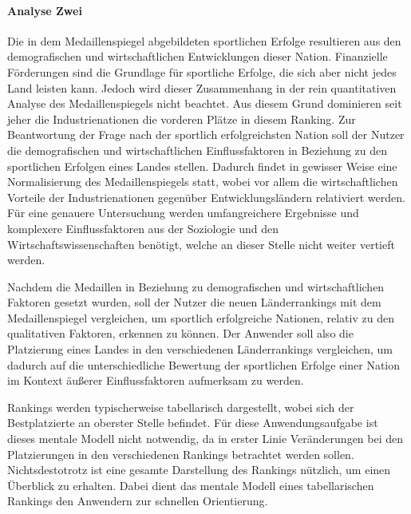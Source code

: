 \paragraph{Analyse Zwei}
Die in dem Medaillenspiegel abgebildeten sportlichen Erfolge resultieren aus den demografischen und wirtschaftlichen Entwicklungen dieser Nation. Finanzielle Förderungen sind die Grundlage für sportliche Erfolge, die sich aber nicht jedes Land leisten kann. Jedoch wird dieser Zusammenhang in der rein quantitativen Analyse des Medaillenspiegels nicht beachtet. Aus diesem Grund dominieren seit jeher die Industrienationen die vorderen Plätze in diesem Ranking. Zur Beantwortung der Frage nach der sportlich erfolgreichsten Nation soll der Nutzer die demografischen und wirtschaftlichen Einflussfaktoren in Beziehung zu den sportlichen Erfolgen eines Landes stellen. Dadurch findet in gewisser Weise eine Normalisierung des Medaillenspiegels statt, wobei vor allem die wirtschaftlichen Vorteile der Industrienationen gegenüber Entwicklungsländern relativiert werden. Für eine genauere Untersuchung werden umfangreichere Ergebnisse und komplexere Einflussfaktoren aus der Soziologie und den Wirtschaftswissenschaften benötigt, welche an dieser Stelle nicht weiter vertieft werden.

Nachdem die Medaillen in Beziehung zu demografischen und wirtschaftlichen Faktoren gesetzt wurden, soll der Nutzer die neuen Länderrankings mit dem Medaillenspiegel vergleichen, um sportlich erfolgreiche Nationen, relativ zu den qualitativen Faktoren, erkennen zu können. Der Anwender soll also die Platzierung eines Landes in den verschiedenen Länderrankings vergleichen, um dadurch auf die unterschiedliche Bewertung der sportlichen Erfolge einer Nation im Kontext äußerer Einflussfaktoren aufmerksam zu werden.

Rankings werden typischerweise tabellarisch dargestellt, wobei sich der Bestplatzierte an oberster Stelle befindet. Für diese Anwendungsaufgabe ist dieses mentale Modell nicht notwendig, da in erster Linie Veränderungen bei den Platzierungen in den verschiedenen Rankings betrachtet werden sollen. Nichtsdestotrotz ist eine gesamte Darstellung des Rankings nützlich, um einen Überblick zu erhalten. Dabei dient das mentale Modell eines tabellarischen Rankings den Anwendern zur schnellen Orientierung.

